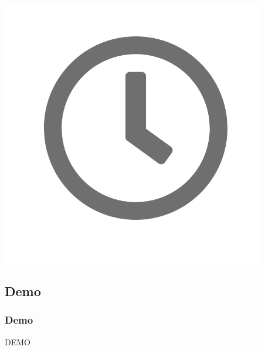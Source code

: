 \begin{frame}
\begin{center}
 \includegraphics[scale = 0.25]{images/clock}
  \end{center}
\end{frame}

\subsection{Demo}
\begin{frame}
  \frametitle{Demo}
  \begin{center}
    \huge{DEMO}
  \end{center}
\end{frame}
